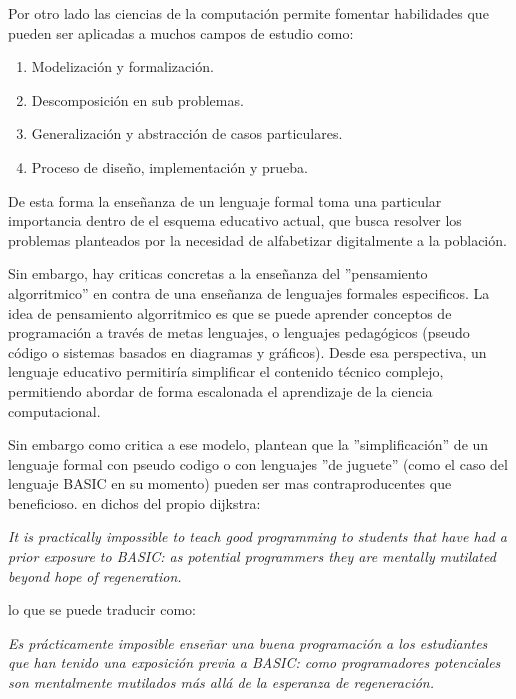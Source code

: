 Por otro lado las ciencias de la computación permite fomentar habilidades que pueden ser aplicadas a muchos campos de estudio como:

\begin{enumerate}
  \item Modelización y formalización.
  \item Descomposición en sub problemas.
  \item Generalización y abstracción de casos particulares.
  \item Proceso de diseño, implementación y prueba.
\end{enumerate}

De esta forma la enseñanza de un lenguaje formal toma una particular importancia dentro de el esquema educativo actual, que busca resolver los problemas planteados por la necesidad de alfabetizar digitalmente a la población.

Sin embargo, hay criticas concretas a la enseñanza del ''pensamiento algorritmico'' en contra de una enseñanza de lenguajes formales especificos. La idea de pensamiento algorritmico es que se puede aprender conceptos de programación a través de metas lenguajes, o lenguajes pedagógicos (pseudo código o sistemas basados en diagramas y gráficos). Desde esa perspectiva, un lenguaje educativo permitiría simplificar el contenido técnico complejo, permitiendo abordar de forma escalonada el aprendizaje de la ciencia computacional.

Sin embargo como critica a ese modelo, \cite{dijkstra2010que} plantean que la ''simplificación'' de un lenguaje formal con pseudo codigo o con lenguajes ''de juguete'' (como el caso del lenguaje BASIC en su momento) pueden ser mas  contraproducentes que beneficioso. en dichos del propio dijkstra:

\begin{center}
\textit{It is practically impossible to teach good programming to students that have had a prior exposure to BASIC: as potential programmers they are mentally mutilated beyond hope of regeneration.}
\end{center}

lo que se puede traducir como:

\begin{center}
\textit{Es prácticamente imposible enseñar una buena programación a los estudiantes que han tenido una exposición previa a BASIC: como programadores potenciales son mentalmente mutilados más allá de la esperanza de regeneración.}
\end{center}

